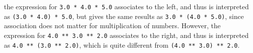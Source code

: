 %
%
%
%
the expression for \lstinline|3.0 * 4.0 * 5.0| associates to the left, and thus is interpreted as \mbox{\lstinline|(3.0 * 4.0) * 5.0|,} but gives the same results as \lstinline|3.0 * (4.0 * 5.0)|, since association does not matter for multiplication of numbers. However, the expression for \lstinline|4.0 ** 3.0 ** 2.0| associates to the right, and thus is interpreted as \lstinline|4.0 ** (3.0 ** 2.0)|, which is quite different from \lstinline|(4.0 ** 3.0) ** 2.0|. 

